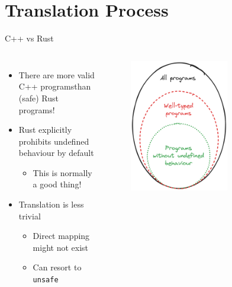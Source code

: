 \documentclass[10pt,aspectratio=169]{beamer}
\begin{document}
\section{Translation Process}

\begin{frame}{C++ vs Rust}
    \begin{columns}[onlytextwidth]
        \centering
            \begin{itemize}
                \item There are more valid C++ programs\newline than (safe) Rust programs!
                \item Rust explicitly prohibits undefined behaviour by default
                \begin{itemize}
                    \item This is normally a good thing!
                \end{itemize}
                \item Translation is less trivial
                \begin{itemize}
                    \item Direct mapping might not exist
                    \item Can resort to \texttt{unsafe}
                \end{itemize}
            \end{itemize}
            \begin{figure}[H]
                \includegraphics[width=0.65\textwidth]{images/excalidraw_programs_venn.png}

\end{figure}
\end{columns}
\end{frame}
\end{document}
